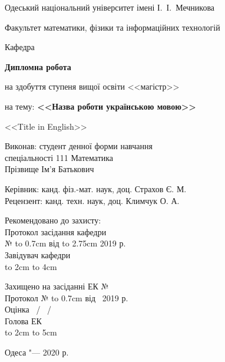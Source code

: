 \thispagestyle{empty}

\begin{center}
Одеський національний університет імені І.~І.~Мечникова

Факультет математики, фізики та інформаційних технологій

Кафедра %
\end{center}

\vspace{2.5cm}

\begin{center}
\large
\textbf{Дипломна робота}

на здобуття ступеня вищої освіти <<магістр>>

\bigskip

на тему: \textbf{<<Назва роботи українською мовою>>}

\bigskip

\small{<<Title in English>>}
\end{center}

\vspace{1cm}

\hfill
\begin{minipage}{0.7\textwidth}
Виконав: студент денної форми навчання\\
спеціальності 111 Математика\\ %
Прізвище Ім'я Батькович

\medskip
\small

Керівник: канд. фіз.-мат. наук, доц. Страхов Є. М. \hrulefill \\
Рецензент: канд. техн. наук, доц. Климчук О. А.
\end{minipage}

\vfill

\noindent
\begin{minipage}{0.375\textwidth}
\small
Рекомендовано до захисту:\\[2\jot]
Протокол засідання кафедри\\[1.5\jot]
№ \hbox to 0.7cm {\hrulefill} від \hbox to 2.75cm {\hrulefill} 2019 р.\\[2\jot]
Завідувач кафедри\\[1.5\jot]
\hbox to 2cm {\hrulefill} \hbox to 4cm{\hrulefill}
\end{minipage}
\hfill
\begin{minipage}{0.5\textwidth}
\small
Захищено на засіданні ЕК № \hrulefill \\[2\jot]
Протокол № \hbox to 0.7cm {\hrulefill} від \hrulefill\ 2019 р.\\[1.5\jot]
Оцінка \hrulefill\ / \hrulefill\ / \hrulefill\ \\[2\jot]
Голова ЕК\\[1.5\jot]
\hbox to 2cm {\hrulefill} \hbox to 5cm{\hrulefill}
\end{minipage}

\vfill

\begin{center}
Одеса "--- 2020 р.
\end{center}
